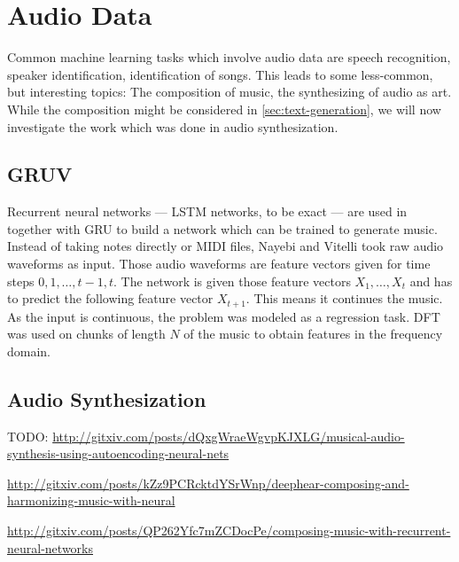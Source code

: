 
\section{Audio Data}
\label{sec:music}

Common machine learning tasks which involve audio data are speech recognition,
speaker identification, identification of songs. This leads to some
less-common, but interesting topics: The composition of music, the synthesizing
of audio as art. While the composition might be considered in
\cref{sec:text-generation}, we will now investigate the work which was done in
audio synthesization.

\subsection{GRUV}

Recurrent neural networks --- \gls{LSTM} networks, to be exact --- are used
in~\cite{nayebigruv} together with \gls{GRU} to build a network which can be
trained to generate music. Instead of taking notes directly or MIDI files,
Nayebi and Vitelli took raw audio waveforms as input. Those audio waveforms are
feature vectors given for time steps $0, 1, \dots, t-1, t$. The network is
given those feature vectors $X_1, \dots, X_t$ and has to predict the following
feature vector $X_{t+1}$. This means it continues the music. As the input is
continuous, the problem was modeled as a regression task. \Gls{DFT} was used on
chunks of length $N$ of the music to obtain features in the frequency domain.


\subsection{Audio Synthesization}
TODO: \href{http://gitxiv.com/posts/dQxgWraeWgvpKJXLG/musical-audio-synthesis-using-autoencoding-neural-nets}{http://gitxiv.com/posts/dQxgWraeWgvpKJXLG/musical-audio-synthesis-using-autoencoding-neural-nets}

\href{http://gitxiv.com/posts/kZz9PCRcktdYSrWnp/deephear-composing-and-harmonizing-music-with-neural}{http://gitxiv.com/posts/kZz9PCRcktdYSrWnp/deephear-composing-and-harmonizing-music-with-neural}

\href{http://gitxiv.com/posts/QP262Yfc7mZCDocPe/composing-music-with-recurrent-neural-networks}{http://gitxiv.com/posts/QP262Yfc7mZCDocPe/composing-music-with-recurrent-neural-networks}

